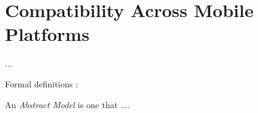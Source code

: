 \section{Compatibility Across Mobile Platforms} \label{Sec:motivationSection}


...


Formal definitions : 

\begin{mydef}
An \emph{Abstract Model} is one that ....
\end{mydef}



